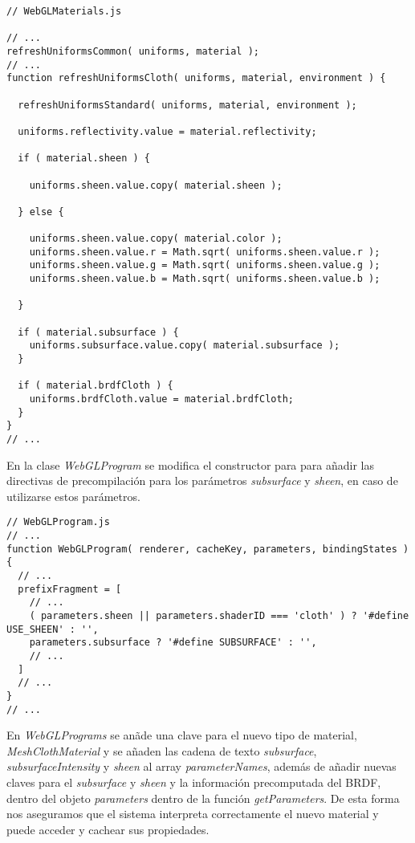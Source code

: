 \singlespacing
\begin{lstlisting}[caption=Cambios sobre la clase WebGLMaterials de ThreeJs]
// WebGLMaterials.js

// ...
refreshUniformsCommon( uniforms, material );
// ...
function refreshUniformsCloth( uniforms, material, environment ) {

  refreshUniformsStandard( uniforms, material, environment );

  uniforms.reflectivity.value = material.reflectivity;

  if ( material.sheen ) {

    uniforms.sheen.value.copy( material.sheen );

  } else {

    uniforms.sheen.value.copy( material.color );
    uniforms.sheen.value.r = Math.sqrt( uniforms.sheen.value.r );
    uniforms.sheen.value.g = Math.sqrt( uniforms.sheen.value.g );
    uniforms.sheen.value.b = Math.sqrt( uniforms.sheen.value.b );

  }

  if ( material.subsurface ) {
    uniforms.subsurface.value.copy( material.subsurface );
  }

  if ( material.brdfCloth ) {
    uniforms.brdfCloth.value = material.brdfCloth;
  }
}
// ...
\end{lstlisting}
\singlespacing

En la clase \textit{WebGLProgram} se modifica el constructor para para a\~nadir las directivas de precompilaci\'on
para los par\'ametros \textit{subsurface} y \textit{sheen}, en caso de utilizarse estos par\'ametros.\\

\begin{lstlisting}[caption=Cambios sobre la clase WebGLProgram de ThreeJs]
// WebGLProgram.js
// ...
function WebGLProgram( renderer, cacheKey, parameters, bindingStates ) {
  // ...
  prefixFragment = [
    // ...
    ( parameters.sheen || parameters.shaderID === 'cloth' ) ? '#define USE_SHEEN' : '',
    parameters.subsurface ? '#define SUBSURFACE' : '',
    // ...
  ]
  // ...
}
// ...
\end{lstlisting}
\singlespacing

En \textit{WebGLPrograms} se an\~ade una clave para el nuevo tipo de material, \textit{MeshClothMaterial}
y se a\~naden las cadena de texto \textit{subsurface}, \textit{subsurfaceIntensity} y \textit{sheen} al array \textit{parameterNames}, adem\'as de a\~nadir nuevas claves para
el \textit{subsurface} y \textit{sheen} y la informaci\'on precomputada del BRDF, dentro del objeto \textit{parameters} dentro de la funci\'on
\textit{getParameters}. De esta forma nos aseguramos que el sistema interpreta correctamente el nuevo material y puede acceder
y cachear sus propiedades.

